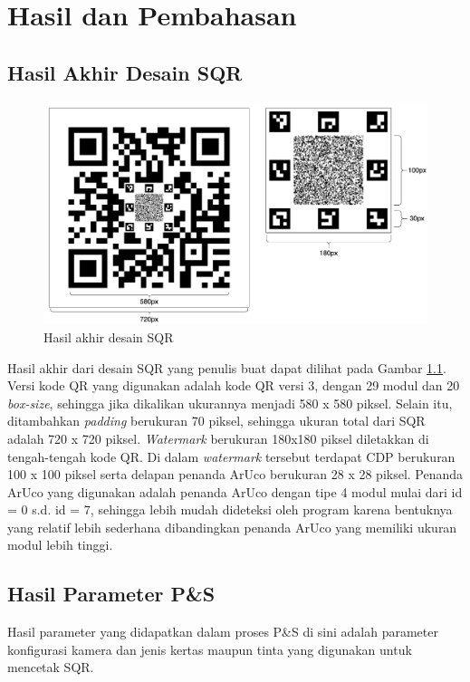 \chapter{Hasil dan Pembahasan}

\section{Hasil Akhir Desain SQR}

\begin{figure}[h]
	\centering
	\includegraphics[width=12cm]{contents/chapter-4/4-modelsqrfinal.png}
	\caption{Hasil akhir desain SQR}
	\label{Fig: 4-modelsqrfinal}
\end{figure}

Hasil akhir dari desain SQR yang penulis buat dapat dilihat pada Gambar \ref{Fig: 4-modelsqrfinal}. Versi kode QR yang digunakan adalah kode QR versi 3, dengan
29 modul dan 20 \emph{box-size}, sehingga jika dikalikan ukurannya menjadi 580 x 580 piksel. Selain itu, ditambahkan \emph{padding} berukuran 70 piksel,
sehingga ukuran total dari SQR adalah 720 x 720 piksel. \emph{Watermark} berukuran 180x180 piksel diletakkan di tengah-tengah kode QR. Di dalam
\emph{watermark} tersebut terdapat CDP berukuran 100 x 100 piksel serta delapan penanda ArUco berukuran 28 x 28 piksel. Penanda ArUco yang digunakan adalah
penanda ArUco dengan tipe 4 modul mulai dari id = 0 s.d. id = 7, sehingga lebih mudah dideteksi oleh program karena bentuknya yang relatif lebih sederhana
dibandingkan penanda ArUco yang memiliki ukuran modul lebih tinggi.

\section{Hasil Parameter P\&S}
Hasil parameter yang didapatkan dalam proses P\&S di sini adalah parameter konfigurasi kamera dan jenis kertas maupun tinta yang digunakan untuk mencetak SQR.
